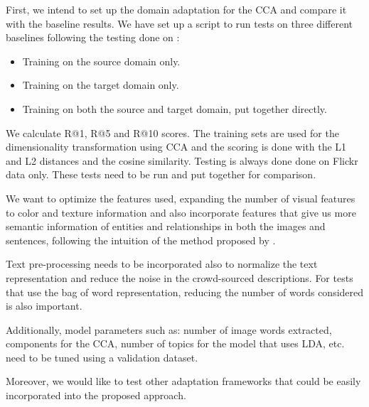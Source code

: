 \documentclass[11pt]{article}
\begin{document}
First, we intend to set up the domain adaptation for the CCA and compare it with the baseline results. We have set up a script to run tests on three different baselines following the testing done on \cite{daumeiii:2007:ACLMain}:

\begin{itemize}
\item Training on the source domain only.
\item Training on the target domain only.
\item Training on both the source and target domain, put together directly.
\end{itemize}

We calculate R@1, R@5 and R@10 scores. The training sets are used for the dimensionality transformation using CCA and the scoring is done with the L1 and L2 distances and the cosine similarity. Testing is always done done on Flickr data only. These tests need to be run and put together for comparison.

We want to optimize the features used, expanding the number of visual features to color and texture information and also incorporate features that give us more semantic information of entities and relationships in both the images and sentences, following the intuition of the method proposed by \cite{6751319}. 

Text pre-processing needs to be incorporated also to normalize the text representation and reduce the noise in the crowd-sourced descriptions. For tests that use the bag of word representation, reducing the number of words considered is also important.

Additionally, model parameters such as: number of image words extracted, components for the CCA, number of topics for the model that uses LDA, etc. need to be tuned using a validation dataset.

Moreover, we would like to test other adaptation frameworks that could be easily incorporated into the proposed approach. 

\nocite{*}


\end{document}
